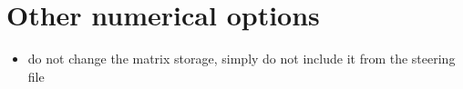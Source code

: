 \section{Other numerical options}
\begin{itemize}
\item do not change the matrix storage, simply do not include it from the steering file
\end{itemize}
